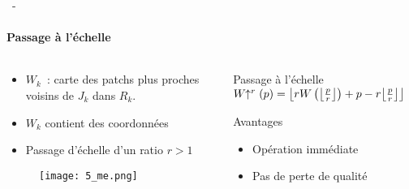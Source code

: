\documentclass[aspectratio=169, 22pt]{beamer}
\DeclarePairedDelimiter\floor{\lfloor}{\rfloor}
\begin{document}
\begin{frame}{\secname~- \subsecname}
  \framesubtitle{Passage à l'échelle}
  \begin{columns}
    \begin{column}{0.5\linewidth}
      \begin{itemize}
      \item $W_k$~: carte des patchs plus proches voisins de $J_k$ dans $R_k$.
      \item $W_k$ contient des \alert{coordonnées}
      \item Passage d'échelle d'un ratio $r > 1$
      \end{itemize}
      \begin{figure}
        \texttt{[image: 5\_me.png]}
      \end{figure}

    \end{column}
    \begin{column}{0.5\linewidth}
      \begin{block}{Passage à l'échelle}
        \centering
        $W\!\!\uparrow^r(p) = \floor*{rW\left(\floor*{\frac{p}{r}}\right) + p - r\floor*{\frac{p}{r}}}$
      \end{block}
      \vspace{1em}
      \begin{exampleblock}{Avantages}
        \begin{itemize}
        \item Opération immédiate
        \item Pas de perte de qualité
        \end{itemize}
      \end{exampleblock}
    \end{column}
  \end{columns}
\end{frame}
\end{document}

